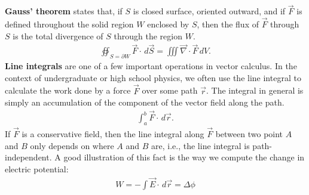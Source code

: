 \documentclass{book}
\theoremstyle{definition}
\begin{document}
\textbf{Gauss' theorem} states that, if $S$ is closed surface, oriented outward, and if $\vec{F}$ is defined throughout the solid region $W$ enclosed by $S$, then the flux of $\vec{F}$ through $S$ is the total divergence of $S$ through the region $W$.
\begin{align*}
\boxed{
\oiint_{S=\partial W}\vec{F}\cdot\,d\vec{S} = \iiint \vec{\nabla}\cdot\vec{F}\,dV.}
\end{align*}
\textbf{Line integrals} are one of a few important operations in vector calculus. In the context of undergraduate or high school physics, we often use the line integral to calculate the work done by a force $\vec{F}$ over some path $\vec{r}$. The integral in general is simply an accumulation of the component of the vector field along the path. 
\begin{align*}
\int_{a}^{b}\vec{F}\cdot\,d\vec{r}.
\end{align*} 
If $\vec{F}$ is a conservative field, then the line integral along $\vec{F}$ between two point $A$ and $B$ only depends on where $A$ and $B$ are, i.e., the line integral is path-independent. A good illustration of this fact is the way we compute the change in electric potential:
\begin{align*}
W = -\int \vec{E}\cdot\,d\vec{r} = \Delta \phi
\end{align*}
\end{document}
